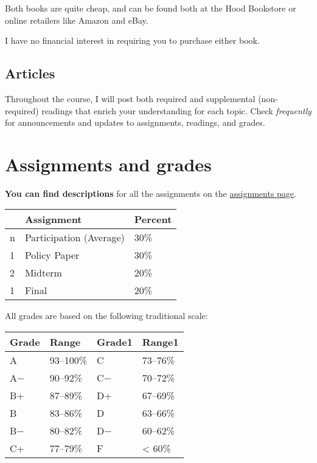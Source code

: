 \documentclass{article}
\begin{document}
Both books are quite cheap, and can be found both at the Hood Bookstore
or online retailers like Amazon and eBay.

I have no financial interest in requiring you to purchase either book.

\hypertarget{articles}{%
\subsection{Articles}\label{articles}}

Throughout the course, I will post both required and supplemental
(non-required) readings that enrich your understanding for each topic.
Check \emph{frequently} for announcements and updates to assignments,
readings, and grades.

\hypertarget{assignments-and-grades}{%
\section{Assignments and grades}\label{assignments-and-grades}}

\textbf{You can find descriptions} for all the assignments on the
\href{http://devf19.classes.ryansafner.com/assignments/}{assignments
page}.

\begin{center}

\begin{tabular}{lll}
\toprule
 & Assignment & Percent\\
\midrule
n & Participation (Average) & 30\%\\
1 & Policy Paper & 30\%\\
2 & Midterm & 20\%\\
1 & Final & 20\%\\
\bottomrule
\end{tabular}
\end{center}

All grades are based on the following traditional scale:

\begin{center}

\begin{tabular}{llll}
\toprule
Grade & Range & Grade1 & Range1\\
\midrule
A & 93–100\% & C & 73–76\%\\
A− & 90–92\% & C− & 70–72\%\\
B+ & 87–89\% & D+ & 67–69\%\\
B & 83–86\% & D & 63–66\%\\
B− & 80–82\% & D− & 60–62\%\\
\addlinespace
C+ & 77–79\% & F & < 60\%\\
\bottomrule
\end{tabular}
\end{center}
\end{document}
